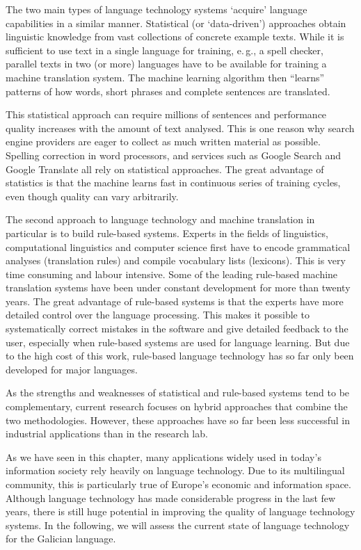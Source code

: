 \begin{multicols}{2}
    The two main types of language technology systems ‘acquire’ language capabilities in a similar manner. Statistical (or ‘data-driven’) approaches obtain linguistic knowledge from vast collections of concrete example texts. While it is sufficient to use text in a single language for training, e.\,g., a spell checker, parallel texts in two (or more) languages have to be available for training a machine translation system. The machine learning algorithm then “learns” patterns of how words, short phrases and complete sentences are translated. 

    This statistical approach can require millions of sentences and performance quality increases with the amount of text analysed. This is one reason why search engine providers are eager to collect as much written material as possible. Spelling correction in word processors, and services such as Google Search and Google Translate all rely on statistical approaches. The great advantage of statistics is that the machine learns fast in continuous series of training cycles, even though quality can vary arbitrarily.

    The second approach to language technology and machine translation in particular is to build rule-based systems. Experts in the fields of linguistics, computational linguistics and computer science first have to encode grammatical analyses (translation rules) and compile vocabulary lists (lexicons). This is very time consuming and labour intensive. Some of the leading rule-based machine translation systems have been under constant development for more than twenty years. The great advantage of rule-based systems is that the experts have more detailed control over the language processing. This makes it possible to systematically correct mistakes in the software and give detailed feedback to the user, especially when rule-based systems are used for language learning. But due to the high cost of this work, rule-based language technology has so far only been developed for major languages. 

%
As the strengths and weaknesses of statistical and rule-based systems tend to be complementary, current research focuses on hybrid approaches that combine the two methodologies. However, these approaches have so far been less successful in industrial applications than in the research lab. 

    As we have seen in this chapter, many applications widely used in today’s information society rely heavily on language technology. Due to its multilingual community, this is particularly true of Europe’s economic and information space. Although language technology has made considerable progress in the last few years, there is still huge potential in improving the quality of language technology systems. In the following, we will assess the current state of language technology for the Galician language.
\end{multicols}

